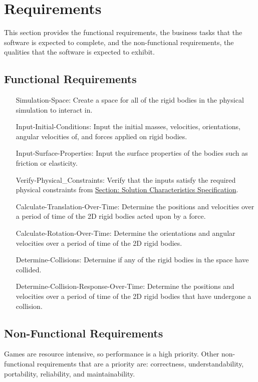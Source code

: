 \documentclass[12pt]{article}
\begin{document}
\section{Requirements}
\label{Sec:Requirements}
This section provides the functional requirements, the business tasks that the software is expected to complete, and the non-functional requirements, the qualities that the software is expected to exhibit.
\subsection{Functional Requirements}
\label{Sec:FRs}
\begin{itemize}
\item[Simulation-Space:\phantomsection\label{reqSS}]Create a space for all of the rigid bodies in the physical simulation to interact in.
\item[Input-Initial-Conditions:\phantomsection\label{reqIIC}]Input the initial masses, velocities, orientations, angular velocities of, and forces applied on rigid bodies.
\item[Input-Surface-Properties:\phantomsection\label{reqISP}]Input the surface properties of the bodies such as friction or elasticity.
\item[Verify-Physical\_Constraints:\phantomsection\label{reqVPC}]Verify that the inputs satisfy the required physical constraints from \hyperref[Sec:SolCharSpec]{Section: Solution Characteristics Specification}.
\item[Calculate-Translation-Over-Time:\phantomsection\label{reqCTOT}]Determine the positions and velocities over a period of time of the 2D rigid bodies acted upon by a force.
\item[Calculate-Rotation-Over-Time:\phantomsection\label{reqCROT}]Determine the orientations and angular velocities over a period of time of the 2D rigid bodies.
\item[Determine-Collisions:\phantomsection\label{reqDC}]Determine if any of the rigid bodies in the space have collided.
\item[Determine-Collision-Response-Over-Time:\phantomsection\label{reqDCROT}]Determine the positions and velocities over a period of time of the 2D rigid bodies that have undergone a collision.
\end{itemize}
\subsection{Non-Functional Requirements}
\label{Sec:NFRs}
Games are resource intensive, so performance is a high priority. Other non-functional requirements that are a priority are: correctness, understandability, portability, reliability, and maintainability.
\end{document}
